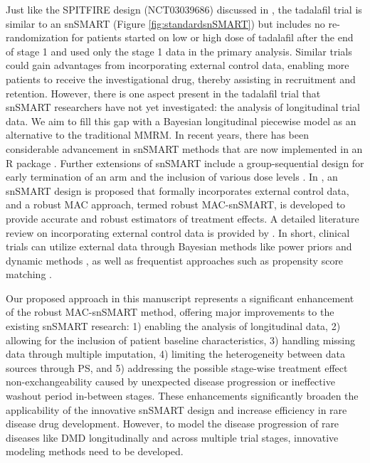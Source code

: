 Just like the SPITFIRE design (NCT03039686) discussed in \cite{wang2023dynamic}, the tadalafil trial is similar to an \ac{snSMART} \citep{tamura2016small} (Figure \ref{fig:standardsnSMART}) but includes no re-randomization for patients started on low or high dose of tadalafil after the end of stage 1 and used only the stage 1 data in the primary analysis. Similar trials could gain advantages from incorporating external control data, enabling more patients to receive the investigational drug, thereby assisting in recruitment and retention. However, there is one aspect present in the tadalafil trial that \ac{snSMART} researchers have not yet investigated: the analysis of longitudinal trial data. We aim to fill this gap with a Bayesian longitudinal piecewise model as an alternative to the traditional MMRM. In recent years, there has been considerable advancement in \ac{snSMART} methods \citep{wei2018bayesian, wei2020sample, hartman2021design} that are now implemented in an R package \citep{sidisnSMART}. Further extensions of \ac{snSMART} include a group-sequential design for early termination of an arm \citep{chao2020bayesian} and the inclusion of various dose levels \citep{fang2021bayesian, fang2023comparing}. In \cite{wang2023dynamic}, an \ac{snSMART} design is proposed that formally incorporates external control data, and a robust \ac{MAC} approach, termed robust MAC-snSMART, is developed to provide accurate and robust estimators of treatment effects. A detailed literature review on incorporating external control data is provided by \cite{wang2023dynamic}. In short, clinical trials can utilize external data through Bayesian methods like power priors \citep{ibrahim2000power} and dynamic methods \citep{duan2005modified, neuenschwander2009note, neuenschwander2010summarizing, neuenschwander2016use, hobbs2011hierarchical, schmidli2014robust}, as well as frequentist approaches such as propensity score matching \citep{rosenbaum1983central, lin2018propensity}. 

Our proposed approach in this manuscript represents a significant enhancement of the robust MAC-snSMART method, offering major improvements to the existing \ac{snSMART} research: 1) enabling the analysis of longitudinal data, 2) allowing for the inclusion of patient baseline characteristics, 3) handling missing data through multiple imputation, 4) limiting the heterogeneity between data sources through \ac{PS}, and 5) addressing the possible stage-wise treatment effect non-exchangeability caused by unexpected disease progression or ineffective washout period in-between stages. These enhancements significantly broaden the applicability of the innovative \ac{snSMART} design and increase efficiency in rare disease drug development. However, to model the disease progression of rare diseases like \ac{DMD} longitudinally and across multiple trial stages, innovative modeling methods need to be developed.

